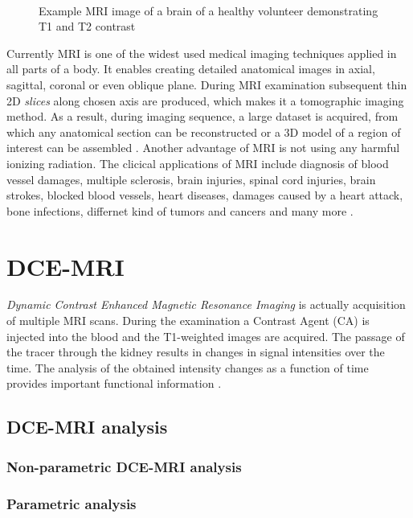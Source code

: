  
\begin{figure}
\captionsetup[subfloat]{captionskip=0.5cm}
	\centering
	\hspace{1.5cm}
	\\	
\vspace{0.5cm}
\caption[lol]{Example MRI image of a brain of a healthy volunteer demonstrating T1 and T2 contrast}
\label{fig:t1t2}
\end{figure}

Currently MRI is one of the widest used medical imaging techniques applied in all parts of a body. It enables creating detailed anatomical images in axial, sagittal, coronal or even oblique plane. During MRI examination subsequent thin 2D \textit{slices} along chosen axis are produced, which makes it a tomographic imaging method. As a result, during imaging sequence, a large dataset is acquired, from which any anatomical section can be reconstructed or a 3D model of a region of interest can be assembled \cite {bushong2014magnetic}. Another advantage of MRI is not using any harmful ionizing radiation.
The clicical applications of MRI include diagnosis of blood vessel damages, multiple sclerosis, brain injuries, spinal cord injuries, brain strokes, blocked blood vessels, heart diseases, damages caused by a heart attack, bone infections, differnet kind of tumors and cancers and many more \cite{mriApplications}.

\section{DCE-MRI}
\textit{Dynamic Contrast Enhanced Magnetic Resonance Imaging} is actually acquisition of multiple MRI scans. During the examination a Contrast Agent (CA) is injected into the blood and the T1-weighted images are acquired. The passage of the tracer through the kidney results in changes in signal intensities over the time.
The analysis of the obtained intensity changes as a function of time provides important functional information \cite{bokacheva2008assessment, khalifa2014models}.

\begin{comment}
 Traditionally, this evaluation is performed by experienced observer, although this method is very subjective and strongly depends on the experience of the expert. Other technique involves fitting tissue intensity changes to pharmacokinetic models, which allows quantification of renal function \cite{khalifa2014models}. Even though this strategy is gaining more and more supporters, most of the methods still require interference of the human at some stage, which makes them vulnerable to human factors.
\end{comment}
\subsection{DCE-MRI analysis}

\subsubsection{Non-parametric DCE-MRI analysis}


\subsubsection{Parametric analysis}
